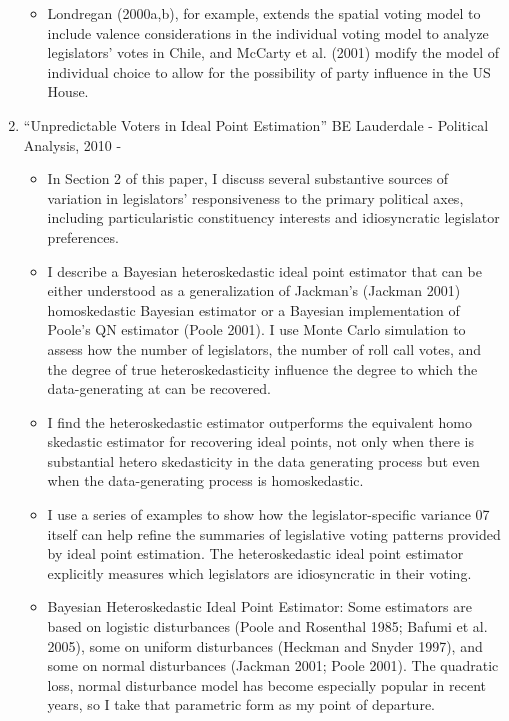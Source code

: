 \documentclass[a4paper,12pt]{article}
\begin{document}
\begin{enumerate}
\begin{itemize}
\item Londregan (2000a,b), for example, extends the spatial voting model to include valence considerations in the individual voting model to analyze legislators’ votes in Chile, and McCarty et al. (2001) modify the model of individual choice to allow for the possibility of party influence in the US House. 
\end{itemize}

\newpage


\item “Unpredictable Voters in Ideal Point Estimation” BE Lauderdale - Political Analysis, 2010 -  
\begin{itemize}
\item In Section 2 of this paper, I discuss several substantive sources of variation in legislators' responsiveness to the primary political axes, including particularistic constituency interests and idiosyncratic legislator preferences. 
\item I describe a Bayesian heteroskedastic ideal point estimator that can be either understood as a generalization of Jackman's (Jackman 2001) homoskedastic Bayesian estimator or a Bayesian implementation of Poole's QN estimator (Poole 2001). I use Monte Carlo simulation to assess how the number of legislators, the number of roll call votes, and the degree of true heteroskedasticity influence the degree to which the data-generating at can be recovered. 
\item I find the heteroskedastic estimator outperforms the equivalent homo skedastic estimator for recovering ideal points, not only when there is substantial hetero skedasticity in the data generating process but even when the data-generating process is homoskedastic.
\item I use a series of examples to show how the legislator-specific variance 07 itself can help refine the summaries of legislative voting patterns provided by ideal point estimation. The heteroskedastic ideal point estimator explicitly measures which legislators are idiosyncratic in their voting. 
\item Bayesian Heteroskedastic Ideal Point Estimator: Some estimators are based on logistic disturbances (Poole and Rosenthal 1985; Bafumi et al. 2005), some on uniform disturbances (Heckman and Snyder 1997), and some on normal disturbances (Jackman 2001; Poole 2001). The quadratic loss, normal disturbance model has become especially popular in recent years, so I take that parametric form as my point of departure. 

\end{itemize}
\end{enumerate}
\end{document}

